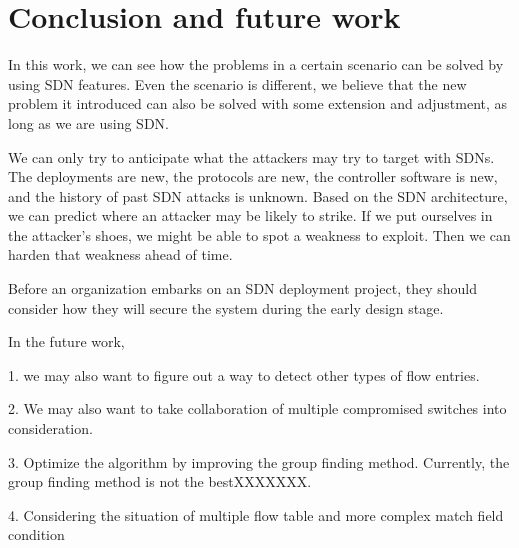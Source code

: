 \chapter{Conclusion and future work}
\label{conclusion}
In this work, we can see how the problems in a certain scenario can be solved by using SDN features. Even the scenario is different, we believe that the new problem it introduced can also be solved with some extension and adjustment, as long as we are using SDN.


We can only try to anticipate what the attackers may try to target with SDNs.  The deployments are new, the protocols are new, the controller software is new, and the history of past SDN attacks is unknown.  Based on the SDN architecture, we can predict where an attacker may be likely to strike.  If we put ourselves in the attacker’s shoes, we might be able to spot a weakness to exploit. Then we can harden that weakness ahead of time.

Before an organization embarks on an SDN deployment project, they should consider how they will secure the system during the early design stage. 

In the future work, 

1. we may also want to figure out a way to detect other types of flow entries.

2. We may also want to take collaboration of multiple compromised switches into consideration.

3. Optimize the algorithm by improving the group finding method. Currently, the group finding method is not the bestXXXXXXX.

4. Considering the situation of multiple flow table and more complex match field condition